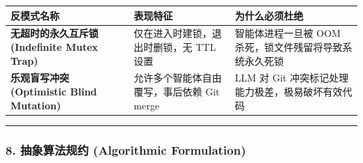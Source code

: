 {\def\LTcaptype{} %
\begin{longtable}[]{@{}
  >{\raggedright\arraybackslash}p{}
  >{\raggedright\arraybackslash}p{}
  >{\raggedright\arraybackslash}p{}@{}}
\toprule\noalign{}
\begin{minipage}[b]{\linewidth}\raggedright
反模式名称
\end{minipage} & \begin{minipage}[b]{\linewidth}\raggedright
表现特征
\end{minipage} & \begin{minipage}[b]{\linewidth}\raggedright
为什么必须杜绝
\end{minipage} \\
\midrule\noalign{}
\endhead
\bottomrule\noalign{}
\endlastfoot
\textbf{无超时的永久互斥锁 (Indefinite Mutex Trap)} &
仅在进入时建锁，退出时删锁，无 TTL 设置 & 智能体进程一旦被 OOM
杀死，锁文件残留将导致系统永久死锁 \\
\textbf{乐观盲写冲突 (Optimistic Blind Mutation)} &
允许多个智能体自由覆写，事后依赖 Git merge & LLM 对 Git
冲突标记处理能力极差，极易破坏有效代码 \\
\end{longtable}
}

\begin{center}\rule{0.5\linewidth}{0.5pt}\end{center}

\subsubsection{8. 抽象算法规约 (Algorithmic
Formulation)}\label{ux62bdux8c61ux7b97ux6cd5ux89c4ux7ea6-algorithmic-formulation-8}

